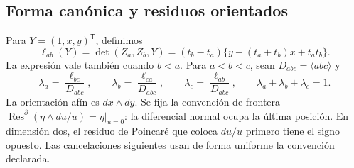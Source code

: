 \subsection{Forma canónica y residuos orientados}

Para \(Y=(1,x,y)^\mathsf T\), definimos
\begin{equation}
 \ell_{ab}(Y)=\det(Z_a,Z_b,Y)
 =(t_b-t_a)\{y-(t_a+t_b)x+t_at_b\}.
 \label{eq:polygon-lines}
\end{equation}
La expresión vale también cuando \(b<a\). Para \(a<b<c\), sean
\(D_{abc}=\langle abc\rangle\) y
\begin{equation}
 \lambda_a=\frac{\ell_{bc}}{D_{abc}},\qquad
 \lambda_b=\frac{\ell_{ca}}{D_{abc}},\qquad
 \lambda_c=\frac{\ell_{ab}}{D_{abc}},\qquad
 \lambda_a+\lambda_b+\lambda_c=1.
 \label{eq:polygon-barycentric}
\end{equation}
La orientación afín es \(dx\wedge dy\). Se fija la convención de frontera
\(\operatorname{Res}^{\partial}(\eta\wedge du/u)=\eta|_{u=0}\):
la diferencial normal ocupa la última posición. En dimensión dos, el
residuo de Poincaré que coloca \(du/u\) primero tiene el signo opuesto.
Las cancelaciones siguientes usan de forma uniforme la convención declarada.

